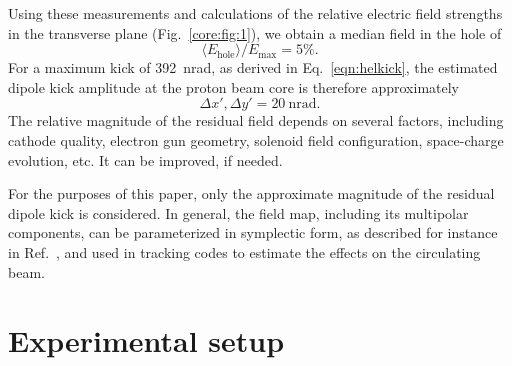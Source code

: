 \documentclass[aps
,prstab
,reprint
,longbibliography
,preprintnumbers
,showkeys
,amsfonts,amssymb,amsmath
,floatfix
]{revtex4-1}
\newcommand{\q}[2]{\ensuremath{#1\ \mathrm{#2}}} %
\begin{document}
Using these measurements and calculations of the relative electric
field strengths in the transverse plane (Fig.~\ref{core:fig:1}), we
obtain a median field in the hole of
%
\begin{equation}
  \langle E_\mathrm{hole} \rangle / E_\mathrm{max} =  5\%.
\end{equation}
%
For a maximum kick of 392~nrad, as derived in Eq.~\ref{eqn:helkick},
the estimated dipole kick amplitude at the proton beam core is therefore
approximately
%
\begin{equation}
  \label{eqn:kick_central}
  \Delta x' , \Delta y' = \q{20}{nrad}.
\end{equation}
%
The relative magnitude of the residual field depends on several
factors, including cathode quality, electron gun geometry, solenoid
field configuration, space-charge evolution, etc. It can be improved,
if needed.

For the purposes of this paper, only the approximate magnitude of the
residual dipole kick is considered. In general, the field map,
including its multipolar components, can be parameterized in
symplectic form, as described for instance in
Ref.~\cite{hel_bends_stancari}, and used in tracking codes to estimate
the effects on the circulating beam.



\section{Experimental setup}
\label{sec:exp}
\end{document}
